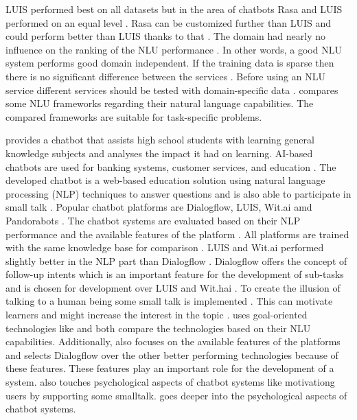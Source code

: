 LUIS performed best on all datasets but in the area of chatbots Rasa and LUIS performed on an equal level \cite{braunEvaluatingNLU}.
Rasa can be customized further than LUIS and could perform better than LUIS thanks to that \cite{braunEvaluatingNLU}. 
The domain had nearly no influence on the ranking of the NLU performance \cite{braunEvaluatingNLU}.
In other words, a good NLU system performs good domain independent.
If the training data is sparse then there is no significant difference between the services \cite{braunEvaluatingNLU}. 
Before using an NLU service different services should be tested with domain-specific data \cite{braunEvaluatingNLU}.
\citet{braunEvaluatingNLU} compares some NLU frameworks regarding their natural language capabilities.
The compared frameworks are suitable for task-specific problems.

\citet{dutta2017developing} provides a chatbot that assists high school students with learning general 
knowledge subjects and analyses the impact it had on learning.
AI-based chatbots are used for banking systems, customer services, and education \cite{dutta2017developing}.
The developed chatbot is a web-based education solution using natural language processing (NLP) techniques
to answer questions and is also able to participate in small talk \cite{dutta2017developing}.
Popular chatbot platforms are Dialogflow, LUIS, Wit.ai amd Pandorabots \cite{dutta2017developing}.
The chatbot systems are evaluated based on their NLP performance and the available features of the platform 
\cite{dutta2017developing}. 
All platforms are trained with the same knowledge base for comparison \cite{dutta2017developing}. 
LUIS and Wit.ai performed slightly better in the NLP part than Dialogflow \cite{dutta2017developing}.
Dialogflow offers the concept of follow-up intents which is an important feature for the development 
of sub-tasks and is chosen for development over LUIS and Wit.hai \cite{dutta2017developing}.
To create the illusion of talking to a human being some small talk is implemented \cite{dutta2017developing}. 
This can motivate learners and might increase the interest in the topic \cite{dutta2017developing}.
\citet{dutta2017developing} uses goal-oriented technologies like \citet{braunEvaluatingNLU} and 
both compare the technologies based on their NLU capabilities.
Additionally, \citet{dutta2017developing} also focuses on the available features of the 
platforms and selects Dialogflow over the other better performing technologies because 
of these features.
These features play an important role for the development of a system.
\citet{dutta2017developing} also touches psychological aspects of chatbot systems 
like motivationg users by supporting some smalltalk. 
\citet{GO2019304} goes deeper into the psychological aspects of chatbot systems.

